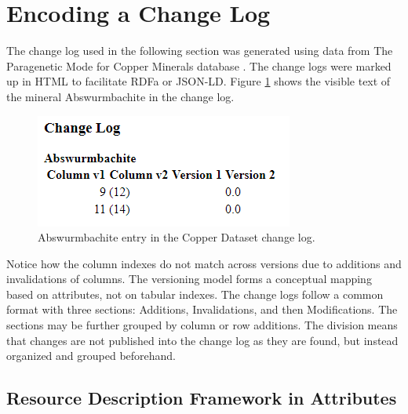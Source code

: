 \section{Encoding a Change Log}

The change log used in the following section was generated using data from The Paragenetic Mode for Copper Minerals database \cite{Morrison2016}.
The change logs were marked up in HTML to facilitate RDFa or JSON-LD.
Figure \ref{changelog_zoomed} shows the visible text of the mineral Abswurmbachite in the change log.
\begin{figure}[b]
	\centering
	\includegraphics[scale=0.80]{Changelog-zoomed.png}
	\caption{Abswurmbachite entry in the Copper Dataset change log.}
	\label{changelog_zoomed}
\end{figure}
Notice how the column indexes do not match across versions due to additions and invalidations of columns.
The versioning model forms a conceptual mapping based on attributes, not on tabular indexes.
The change logs follow a common format with three sections: Additions, Invalidations, and then Modifications.
The sections may be further grouped by column or row additions.
The division means that changes are not published into the change log as they are found, but instead organized and grouped beforehand.

\subsection{Resource Description Framework in Attributes}

